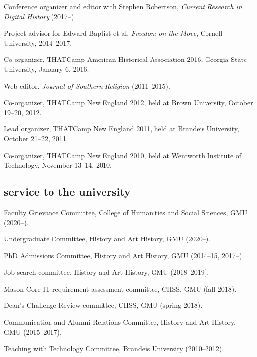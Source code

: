 \documentclass[11pt]{article}
\begin{document}
Conference organizer and editor with Stephen Robertson, \emph{Current Research 
  in Digital History} (2017--).

Project advisor for Edward Baptist et al, \emph{Freedom on the Move}, Cornell 
University, 2014--2017.

Co-organizer, THATCamp American Historical Association 2016, Georgia State University, January 6, 2016.

Web editor, \emph{Journal of Southern Religion} (2011--2015).

Co-organizer, THATCamp New England 2012, held at Brown University,
October 19--20, 2012.

Lead organizer, THATCamp New England 2011, held at Brandeis University,
October 21--22, 2011.

Co-organizer, THATCamp New England 2010, held at Wentworth Institute of
Technology, November 13--14, 2010.


\subsection{service to the university}\label{service-university}

Faculty Grievance Committee, College of Humanities and Social Sciences, GMU (2020--).

Undergraduate Committee, History and Art History, GMU (2020--).

PhD Admissions Committee, History and Art History, GMU (2014--15, 2017--).

Job search committee, History and Art History, GMU (2018--2019).

Mason Core IT requirement assessment committee, CHSS, GMU (fall 2018).

Dean's Challenge Review committee, CHSS, GMU (spring 2018).

Communication and Alumni Relations Committee, History and Art History, GMU 
(2015--2017).

Teaching with Technology Committee, Brandeis University (2010--2012).


\end{document}

